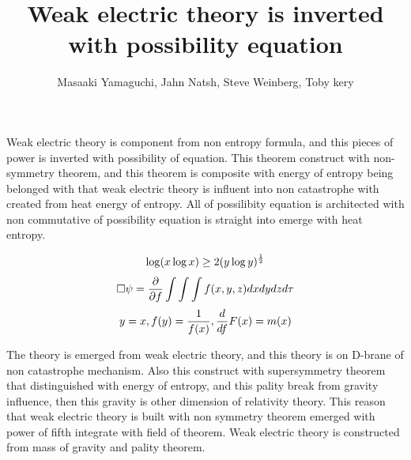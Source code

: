 \documentclass{jsarticle}
\begin{document}
\title{Weak electric theory is inverted with possibility equation}
\author{Masaaki Yamaguchi, Jahn Natsh, Steve Weinberg, Toby kery}
\date{}
\maketitle

 Weak electric theory is component from non entropy formula, and this pieces
of power is inverted with possibility of equation.
 This theorem construct with non-symmetry theorem, and this theorem is composite
with energy of entropy being belonged with that weak electric theory is influent
into non catastrophe with created from heat energy of entropy.
 All of possilibity equation is architected with non commutative of possibility
equation is straight into emerge with heat entropy.
 
 $$ \log (x \log x) \ge 2(y \log y)^{1 \over 2}  $$
 $$ \square \psi = {\partial \over \partial f}\int\int\int{f(x,y,z)dxdydz}
 d\tau $$
 $$ y = x, f(y) = {1 \over f(x)}, {d \over df}F(x) = m(x) $$

 The theory is emerged from weak electric theory, and this theory is on
D-brane of non catastrophe mechanism. Also this construct with supersymmetry
theorem that distinguished with energy of entropy, and this pality break
from gravity influence, then this gravity is other dimension of relativity
theory. This reason that weak electric theory is built with non symmetry
theorem emerged with power of fifth integrate with field of theorem.
Weak electric theory is constructed from mass of gravity and pality theorem.
\end{document}
